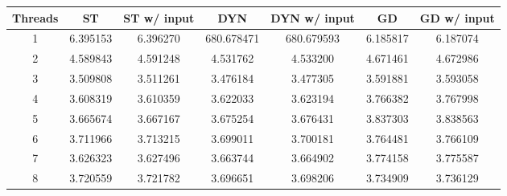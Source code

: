 \begin{tabular}{@{}ccccccc@{}}
\toprule
Threads & ST & ST w/ input & DYN & DYN w/ input & GD & GD w/ input \\ \midrule
1 & 6.395153 & 6.396270 & 680.678471 & 680.679593 & 6.185817 & 6.187074 \\ \midrule
2 & 4.589843 & 4.591248 & 4.531762 & 4.533200 & 4.671461 & 4.672986 \\ \midrule
3 & 3.509808 & 3.511261 & 3.476184 & 3.477305 & 3.591881 & 3.593058 \\ \midrule
4 & 3.608319 & 3.610359 & 3.622033 & 3.623194 & 3.766382 & 3.767998 \\ \midrule
5 & 3.665674 & 3.667167 & 3.675254 & 3.676431 & 3.837303 & 3.838563 \\ \midrule
6 & 3.711966 & 3.713215 & 3.699011 & 3.700181 & 3.764481 & 3.766109 \\ \midrule
7 & 3.626323 & 3.627496 & 3.663744 & 3.664902 & 3.774158 & 3.775587 \\ \midrule
8 & 3.720559 & 3.721782 & 3.696651 & 3.698206 & 3.734909 & 3.736129 \\ \bottomrule
\end{tabular}

